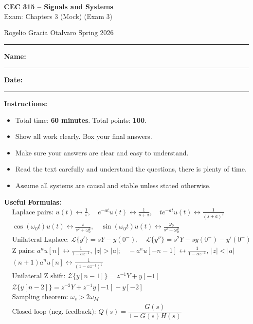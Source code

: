 \documentclass[11pt]{article}
\begin{document}
\begin{center}
    {\LARGE \textbf{CEC 315 -- Signals and Systems}}\\[2pt]
    Exam: Chapters 3 (Mock) \quad (Exam 3)
\end{center}

\noindent Rogelio Gracia Otalvaro \hfill Spring 2026

\vspace{4pt}
\hrule
\vspace{8pt}

\noindent\textbf{Name:} \rule{5cm}{0.4pt} \hfill \textbf{Date:} \rule{4cm}{0.4pt}

\vspace{6pt}

\noindent\textbf{Instructions:}
\begin{itemize}[leftmargin=*, itemsep=1pt, topsep=2pt]
    \item Total time: \textbf{60 minutes}. Total points: \textbf{100}.
    \item Show all work clearly. Box your final answers.
    \item Make sure your answers are clear and easy to understand.
    \item Read the text carefully and understand the questions, there is plenty of time.
    \item Assume all systems are causal and stable unless stated otherwise.
\end{itemize}

\noindent\textbf{Useful Formulas:}
\begin{align*}
&\text{Laplace pairs: } u(t)\leftrightarrow \tfrac{1}{s},\quad e^{-at}u(t)\leftrightarrow \tfrac{1}{s+a},\quad te^{-at}u(t)\leftrightarrow \tfrac{1}{(s+a)^2}\\
&\cos(\omega_0 t)u(t)\leftrightarrow \tfrac{s}{s^2+\omega_0^2},\quad \sin(\omega_0 t)u(t)\leftrightarrow \tfrac{\omega_0}{s^2+\omega_0^2}\\
&\text{Unilateral Laplace: } \mathcal{L}\{y'\} = sY - y(0^-),\quad \mathcal{L}\{y''\} = s^2Y - sy(0^-) - y'(0^-)\\
&\text{Z pairs: } a^n u[n]\leftrightarrow \tfrac{1}{1-az^{-1}},\ |z|>|a|;\quad -a^n u[-n-1]\leftrightarrow \tfrac{1}{1-az^{-1}},\ |z|<|a|\\
&(n+1)a^n u[n]\leftrightarrow \tfrac{1}{(1-az^{-1})^2}\\
&\text{Unilateral Z shift: } \mathcal{Z}\{y[n-1]\} = z^{-1}Y + y[-1]\\
&\mathcal{Z}\{y[n-2]\} = z^{-2}Y + z^{-1}y[-1] + y[-2]\\
&\text{Sampling theorem: } \omega_s > 2\omega_M\\
&\text{Closed loop (neg. feedback): } Q(s) = \dfrac{G(s)}{1+G(s)H(s)}
\end{align*}
\end{document}
